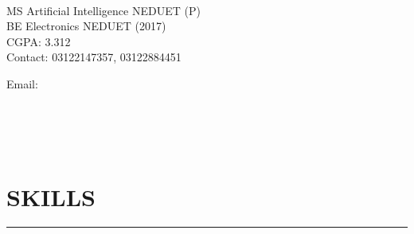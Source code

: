 \documentclass[9pt]{ShumailaAhmed-Resume}
\begin{document}
\begin{minipage}[t]{0.33\textwidth} 
\begin{large}
	\\
\end{large}
\vspace{2pt}MS Artificial Intelligence NEDUET (P)\\
\vspace{2pt}BE Electronics NEDUET (2017)\\%
\vspace{2pt}CGPA: 3.312\\
\vspace{2pt}Contact: 03122147357, 03122884451

\vspace{2pt}\ExternalLink Email: \href{mailto:shumailaahmed2014@gmail.com}{{}}

\vspace{2pt}{\small \ExternalLink Web:} \href{http://www.pyagonist.com}{} \\
\vspace{2pt}{\small \ExternalLink Github:} \href{https://github.com/ShumailaAhmed}{} \\
\vspace{2pt}{\small \ExternalLink LinkedIn:}  \href{https://www.linkedin.com/in/shummi}{} \\
\vspace{2pt}{\small \ExternalLink StackOverflow:} \href{https://stackoverflow.com/users/14975963/shumaila-ahmed}{}


\section{\large  SKILLS}

\noindent\rule{5cm}{0.4pt}

\end{minipage}
\end{document}
